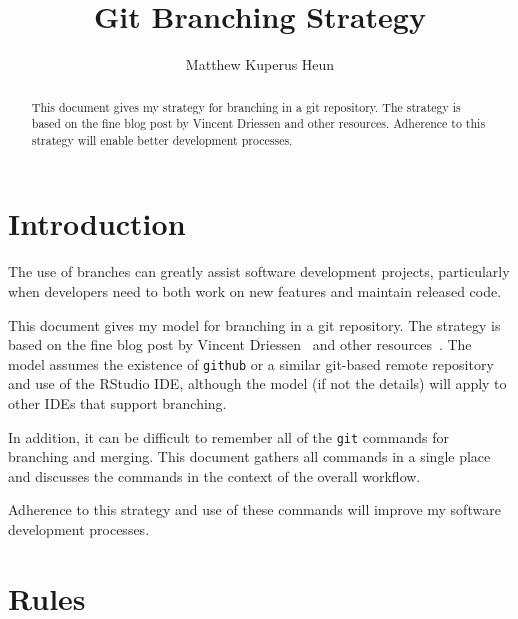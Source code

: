 \documentclass{article}
\begin{document}
\title{Git Branching Strategy}
\author{Matthew Kuperus Heun}

\maketitle


\begin{abstract}

This document gives my strategy for branching in a git repository.
The strategy is based on the fine blog post by Vincent Driessen
and other resources.
Adherence to this strategy will enable better development processes.
\end{abstract}


\section{Introduction}
\label{sec:introduction}
\emph{}
The use of branches can greatly assist software development projects,
particularly when developers need to both
work on new features and maintain released code.

This document gives my model for branching in a git repository.
The strategy is based on the fine blog post by Vincent Driessen~\cite{Driessen:2010}
and other resources~\cite{Onkelinx:2017, Rankin:2010}.
The model assumes the existence of \texttt{github} or a similar git-based remote repository
and use of the RStudio IDE,
although the model (if not the details)
will apply to other IDEs that support branching.

In addition, it can be difficult to remember
all of the \texttt{git} commands for branching and merging.
This document gathers all commands in a single place
and discusses the commands in the context of the overall workflow.

Adherence to this strategy and use of these commands
will improve my software development processes.


\section{Rules}
\label{sec:rules}
\end{document}
